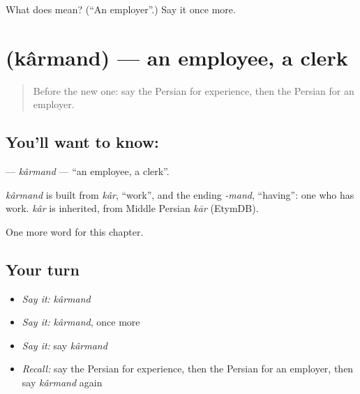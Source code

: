 \begin{tcolorbox}[breakable,colback=teal!4,colframe=teal!35!black,title={Before you move on}]
What does  mean? (\textquotedblleft{}An employer\textquotedblright{}.) Say it once more.
\end{tcolorbox}
\section[\texorpdfstring{\fa{کارمند} (kârmand)}{کارمند (kârmand)}]{ (kârmand) — an employee, a clerk}

\label{lesson:FA-C214-karmand}



\begin{quote}
Before the new one: say the Persian for experience, then the Persian for an employer.
\end{quote}

\subsection*{You'll want to know: }
\textbf{} — \emph{kârmand} — \textquotedblleft{}an employee, a clerk\textquotedblright{}.

\begin{cousinweb}
\emph{kârmand} is built from \emph{kâr}, \textquotedblleft{}work\textquotedblright{}, and the ending \emph{-mand}, \textquotedblleft{}having\textquotedblright{}: one who has work. \emph{kâr} is inherited, from Middle Persian \emph{kār} (EtymDB).
\end{cousinweb}

\begin{grammarlens}[title={What you've built}]
One more word for this chapter.
\end{grammarlens}

\subsection*{Your turn}
\begin{itemize}
\raggedright
  \item \emph{Say it:} \emph{kârmand}
  \item \emph{Say it:} \emph{kârmand}, once more
  \item \emph{Say it:} say \emph{kârmand}
  \item \emph{Recall:} say the Persian for experience, then the Persian for an employer, then say \emph{kârmand} again
\end{itemize}

